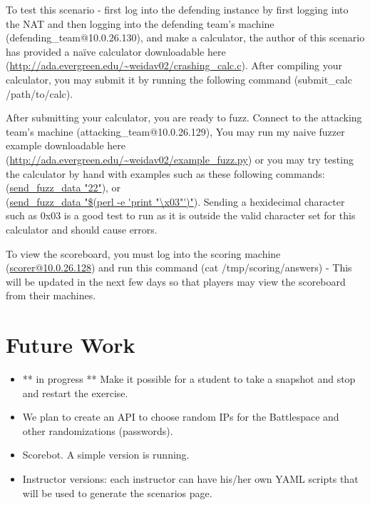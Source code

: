 \documentclass[11pt]{report}
\newcommand{\eat}[1]{}
\begin{document}
To test this scenario - first log into the defending instance by first logging into the NAT and 
then logging into the defending team's machine (defending\_team@10.0.26.130), and make a calculator, 
the author of this scenario has provided a na\"{i}ve calculator downloadable here 
(\url{http://ada.evergreen.edu/~weidav02/crashing_calc.c}). After compiling your calculator, 
you may submit it by running the following command (submit\_calc /path/to/calc).

After submitting your calculator, you are ready to fuzz. Connect to the attacking team's machine 
(attacking\_team@10.0.26.129), You may run my naive fuzzer example downloadable here 
(\url{http://ada.evergreen.edu/~weidav02/example_fuzz.py}) or you may try testing the calculator by hand 
with examples such as these following commands: \\
(\url{send_fuzz_data "22"}), or \\
(\url{send_fuzz_data "$(perl -e 'print "\x03"')"}).   \eat{$}
Sending a hexidecimal character such as 0x03 is a 
good test to run as it is outside the valid character set for this calculator and should cause errors.


To view the scoreboard, you must log into the scoring machine (\url{scorer@10.0.26.128}) 
and run this command (cat /tmp/scoring/answers) - 
This will be updated in the next few days so that players may view the scoreboard from their machines.



\section{Future Work}
\begin{itemize}
 \item ** in progress **  Make it possible for a student to take a snapshot and stop and restart the
   exercise.
 \item We plan to create an API to choose random IPs for the Battlespace and other randomizations (passwords).
 \item Scorebot.  A simple version is running.
 \item Instructor versions: each instructor can have his/her own YAML scripts that will be used to 
   generate the scenarios page.
\end{itemize}
\end{document}
